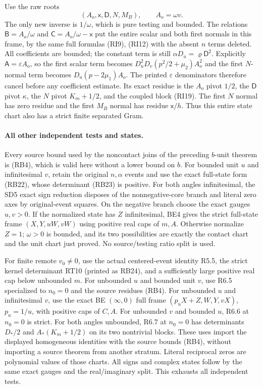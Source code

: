 Use the raw roots
\[
 (A_o,\mathsf x,\mathsf D,N,M_B),\qquad A_o=\omega v.
\]
The only new inverse is $1/\omega$, which is pure testing and
bounded. The relations $\mathsf B=A_o/\omega$ and
$\mathsf C=A_o/\omega-\mathsf x$ put the entire scalar and both
first normals in this frame, by the same full formulas (RI9),
(RI12) with the absent $n$ terms deleted. All coefficients are
bounded; the constant term is still $\alpha D_u=\varrho\mathsf D^2$.
Explicitly $\mathsf A=\varepsilon A_o$, so the first scalar term
becomes $D_u^2D_v(p^2/2+\mu_2)A_o^2$ and the first $N$-normal
term becomes $D_u(p-2\mu_1)A_o$. The printed $\varepsilon$
denominators therefore cancel before any coefficient estimate.
Its exact residue is the $A_o$ pivot $1/2$, the $\mathsf D$ pivot
$\kappa$, the $N$ pivot $K_m+1/2$, and the coupled block (RI19).
The first $N$ normal has zero residue and the first $M_B$ normal
has residue $\mathsf x/h$. Thus this entire state chart
also has a strict finite separated Gram.

\paragraph{All other independent tests and states.}
Every source bound used by the noncontact joins of the preceding
$b$-unit theorem is (RB4), which is valid here without a lower bound
on $b$. For bounded unit $u$ and infinitesimal $v$, retain the original
$n,\alpha$ events and use the exact full-state form (RB22), whose
determinant (RB23) is positive. For both angles infinitesimal, the
SD5 exact sign reduction disposes of the nonnegative-core branch
and literal zero axes by original-event squares. On the negative
branch choose the exact gauges $u,v>0$. If the normalized state has
$Z$ infinitesimal, BE4 gives the strict full-state frame
$(X,Y,uW,vW)$ using positive real caps of $m,A$.
Otherwise normalize $Z=1$; $\omega>0$ is bounded, and its two
possibilities are exactly the contact chart and the unit chart just
proved. No source/testing ratio split is used.

For finite remote $v_0\ne0$, use the actual centered-event identity
R5.5, the strict kernel determinant RT10 (printed as RB24), and a
sufficiently large positive real cap below unbounded $m$.
For unbounded $u$ and bounded unit $v$, use R6.5 specialized to
$n_0=0$ and the source residues (RB4). For unbounded $u$ and
infinitesimal $v$, use the exact BE $(\infty,0)$ full frame
$(p_uX+Z,W,Y,vX)$, $p_u=1/u$, with positive caps of $C,A$.
For unbounded $v$ and bounded $u$, R6.6 at $n_0=0$ is strict.
For both angles unbounded, R6.7 at $n_0=0$ has determinants
$D_*/2$ and $A_*(K_m+1/2)$ on its two nontrivial blocks.
These uses import the displayed homogeneous identities with the
source bounds (RB4), without importing a source theorem from another
stratum.
Literal reciprocal zeros are polynomial values of those charts.
All signs and complex states follow by the same exact gauges and
the real/imaginary split. This exhausts all independent tests.

